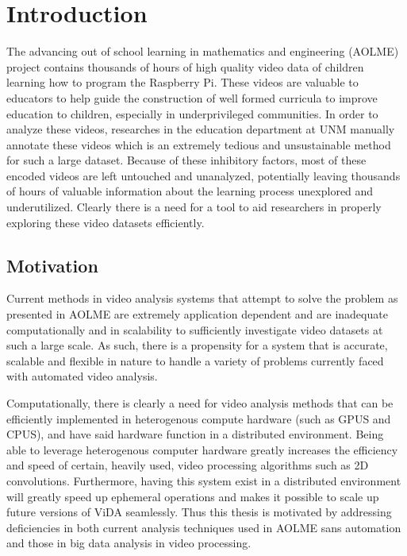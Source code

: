 \chapter{Introduction}
The advancing out of school learning in mathematics and engineering (AOLME)
project contains thousands of hours of high quality video data of children
learning how to program the Raspberry Pi. These videos are valuable to educators
to help guide the construction of well formed curricula to improve education to
children, especially in underprivileged communities. In order to analyze these
videos, researches in the education department at UNM  manually annotate these
videos which is an extremely tedious and unsustainable method for such a large
dataset. Because of these inhibitory factors, most of these encoded videos are
left untouched and unanalyzed, potentially leaving thousands of hours of
valuable information about the learning process unexplored and  underutilized.
Clearly there is a need for a tool to aid researchers in properly exploring
these video datasets efficiently.

\section{\label{section:motivation}Motivation}

Current methods in video analysis systems that attempt to solve the problem  as
presented in AOLME are extremely application dependent and are inadequate
computationally and in scalability to sufficiently investigate video datasets at such
a large scale. As such, there is a propensity for a system that is accurate,
scalable and flexible in nature to handle a variety of problems currently faced
with automated video analysis.

Computationally, there is clearly a need for video analysis methods that can be
efficiently implemented in heterogenous compute hardware (such as GPUS and
CPUS), and have said hardware function in a distributed environment. Being able
to leverage heterogenous computer hardware greatly increases the efficiency and
speed of certain, heavily used, video processing algorithms such as 2D
convolutions. Furthermore, having this system exist in a distributed environment
will greatly speed up ephemeral operations and makes it possible to scale up
future versions of ViDA seamlessly. Thus this thesis is motivated
by addressing deficiencies in both current analysis techniques used in AOLME sans
automation and those in big data analysis in video processing.

